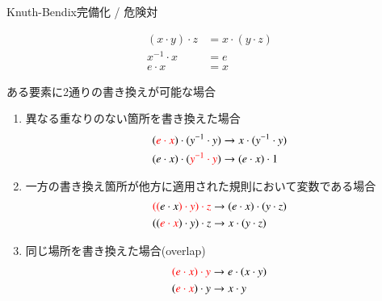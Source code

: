 \documentclass[dvipdfmx,11pt,notheorems]{beamer}
\theoremstyle{definition}
\newcommand{\red}[1]{{\color{red} #1}}
\begin{document}
\begin{frame}{Knuth-Bendix完備化 / 危険対}
  \begin{wrapfigure}{r}{0.3\textwidth}
    \vspace{-20pt}
    \begin{screen}
      \vspace{-15pt}
      \begin{align*}
        (x \cdot y) \cdot z &= x \cdot (y \cdot z) \\
        x^{-1} \cdot x &= e \\
        e \cdot x &= x
      \end{align*}
    \end{screen}
  \end{wrapfigure}

  ある要素に2通りの書き換えが可能な場合

  \begin{enumerate}
    \item 異なる重なりのない箇所を書き換えた場合
    \vspace{-5pt}
    \begin{align*}
      (\red{e \cdot x}) \cdot (y^{-1} \cdot y) &\rightarrow x \cdot (y^{-1} \cdot y) \\
      (e \cdot x) \cdot (\red{y^{-1} \cdot y}) &\rightarrow (e \cdot x) \cdot 1
    \end{align*}
    \item 一方の書き換え箇所が他方に適用された規則において変数である場合
    \vspace{-5pt}
    \begin{align*}
      \red{((}e \cdot x\red{) \cdot y) \cdot z} &\rightarrow (e \cdot x) \cdot (y \cdot z) \\
      ((\red{e \cdot x}) \cdot y) \cdot z &\rightarrow x \cdot (y \cdot z)
    \end{align*}
    \item 同じ場所を書き換えた場合(overlap)
    \vspace{-5pt}
    \begin{align*}
      \red{(e \cdot x) \cdot y} &\rightarrow e \cdot (x \cdot y) \\
      (\red{e \cdot x}) \cdot y &\rightarrow x \cdot y
    \end{align*}
  \end{enumerate}
\end{frame}
\end{document}
